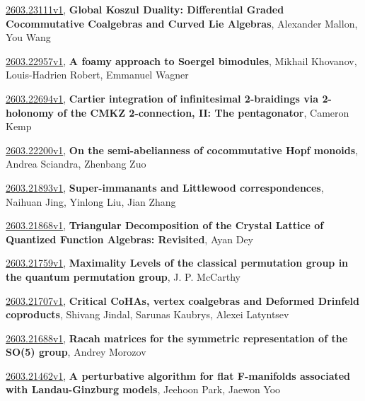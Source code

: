 \documentclass[9pt, a4paper]{article}
\theoremstyle{plain}
\theoremstyle{definition}
\theoremstyle{remark}
\newcommand{\arxiv}[3]{\href{https://arxiv.org/abs/#1}{#1}, \textbf{\textcolor{arxivblue}{#2}}, #3}
\begin{document}
\arxiv{2603.23111v1}{Global Koszul Duality: Differential Graded Cocommutative Coalgebras and Curved Lie Algebras}{Alexander Mallon, You Wang}

\arxiv{2603.22957v1}{A foamy approach to Soergel bimodules}{Mikhail Khovanov, Louis-Hadrien Robert, Emmanuel Wagner}

\arxiv{2603.22694v1}{Cartier integration of infinitesimal 2-braidings via 2-holonomy of the CMKZ 2-connection, II: The pentagonator}{Cameron Kemp}

\arxiv{2603.22200v1}{On the semi-abelianness of cocommutative Hopf monoids}{Andrea Sciandra, Zhenbang Zuo}

\arxiv{2603.21893v1}{Super-immanants and Littlewood correspondences}{Naihuan Jing, Yinlong Liu, Jian Zhang}

\arxiv{2603.21868v1}{Triangular Decomposition of the Crystal Lattice of Quantized Function Algebras: Revisited}{Ayan Dey}

\arxiv{2603.21759v1}{Maximality Levels of the classical permutation group in the quantum permutation group}{J. P. McCarthy}

\arxiv{2603.21707v1}{Critical CoHAs, vertex coalgebras and Deformed Drinfeld coproducts}{Shivang Jindal, Sarunas Kaubrys, Alexei Latyntsev}

\arxiv{2603.21688v1}{Racah matrices for the symmetric representation of the SO(5) group}{Andrey Morozov}

\arxiv{2603.21462v1}{A perturbative algorithm for flat F-manifolds associated with Landau-Ginzburg models}{Jeehoon Park, Jaewon Yoo}

\end{document}
